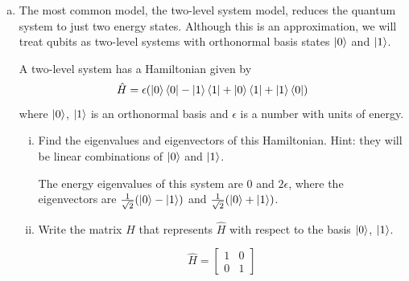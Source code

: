 \documentclass[10pt,letterpaper]{article}
\begin{document}
\begin{enumerate}
\begin{enumerate}[a)]
\begin{enumerate}[i)]
\color{violet}
The transformation matrix $T$ is the following
$$\hat{T} = \ket{\alpha}\bra{\beta} = \begin{bmatrix}
-i \\
2 \\
3i 
\end{bmatrix}\begin{bmatrix}
0 & -i & 4 
\end{bmatrix} = \begin{bmatrix}
0 & -1 & -4i \\
0 & -2i & 8 \\
0 & 3 & 12i 
\end{bmatrix}$$
This matrix is not Hermitian, as it is not a symmetric matrix. 
\color{black}

\end{enumerate}

\item The most common model, the two-level system model, reduces the quantum system to just two energy states. Although this is an approximation, we will treat qubits as two-level systems with orthonormal basis states $\ket{0}$ and $\ket{1}$.

A two-level system has a Hamiltonian given by
$$\hat{H} = \epsilon(\ket{0}\bra{0} - \ket{1}\bra{1} + \ket{0}\bra{1} + \ket{1}\bra{0})$$
where $\ket{0}$, $\ket{1}$ is an orthonormal basis and $\epsilon$ is a number with units of energy.

\begin{enumerate}[i)]

\item Find the eigenvalues and eigenvectors of this Hamiltonian. Hint: they will be linear combinations of $\ket{0}$ and $\ket{1}$. 

\color{violet}
The energy eigenvalues of this system are 0 and $2\epsilon$, where the eigenvectors are $\frac{1}{\sqrt{2}}(\ket{0} - \ket{1})$ and $\frac{1}{\sqrt{2}}(\ket{0} + \ket{1})$. 
\color{black}

\item Write the matrix $H$ that represents $\hat{H}$ with respect to the basis $\ket{0}$, $\ket{1}$. 

\color{violet}
$$\hat{H} = \begin{bmatrix}
1 & 0 \\
0 & 1
\end{bmatrix}$$
\color{black}

\end{enumerate}

\end{enumerate}

\end{enumerate}
\end{document}
